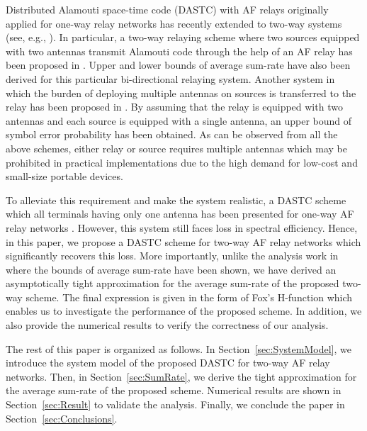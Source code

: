 \documentclass[conference]{IEEEtran}
\begin{document}
Distributed Alamouti space-time code (DASTC) with AF relays
originally applied for one-way relay networks \cite{Duong:08:VTC}
has recently extended to two-way systems (see, e.g.,
\cite{HTHC:08:VTCSpring,HTHC:09:WCOM,ECYL:09:VTCFall}). In
particular, a two-way relaying scheme where two sources equipped
with two antennas transmit Alamouti code through the help of an AF
relay has been proposed in \cite{HTHC:08:VTCSpring,HTHC:09:WCOM}.
Upper and lower bounds of average sum-rate have also been derived
for this particular bi-directional relaying system. Another system
in which the burden of deploying multiple antennas on sources is
transferred to the relay has been proposed in
\cite{ECYL:09:VTCFall}. By assuming that the relay is equipped with
two antennas and each source is equipped with a single antenna, an
upper bound of symbol error probability has been obtained. As can be
observed from all the above schemes, either relay or source requires
multiple antennas which may be prohibited in practical
implementations due to the high demand for low-cost and small-size
portable devices.

To alleviate this requirement and make the system realistic, a DASTC
scheme which all terminals having only one antenna has been
presented for one-way AF relay networks
\cite{NBK:04:JSAC,DNHN:09:WPC}. However, this system still faces
loss in spectral efficiency. Hence, in this paper, we propose a
DASTC scheme for two-way AF relay networks which significantly
recovers this loss. More importantly, unlike the analysis work in
\cite{HTHC:08:VTCSpring,HTHC:09:WCOM} where the bounds of average
sum-rate have been shown, we have derived an asymptotically tight
approximation for the average sum-rate of the proposed two-way
scheme. The final expression is given in the form of Fox's
H-function which enables us to investigate the performance of the
proposed scheme. In addition, we also provide the numerical results
to verify the correctness of our analysis.

The rest of this paper is organized as follows. In
Section~\ref{sec:SystemModel}, we introduce the system model of the
proposed DASTC for two-way AF relay networks. Then, in
Section~\ref{sec:SumRate}, we derive the tight approximation for the
average sum-rate of the proposed scheme. Numerical results are shown
in Section~\ref{sec:Result} to validate the analysis. Finally, we
conclude the paper in Section~\ref{sec:Conclusions}.
\end{document}
